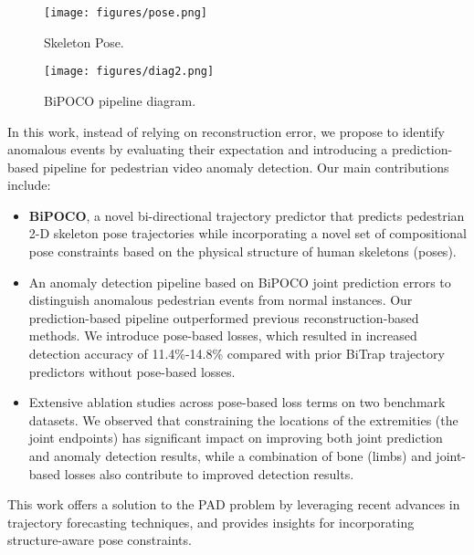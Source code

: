 \documentclass[nohyperref]{article}
\theoremstyle{plain}
\theoremstyle{definition}
\theoremstyle{remark}
\begin{document}
\begin{figure*}[htp!]
\begin{minipage}{0.2\textwidth}
   \centering
  \texttt{[image: figures/pose.png]}
  \caption{Skeleton Pose.}
 \label{fig:sub1}
  \end{minipage}\qquad
  \begin{minipage}{0.78\textwidth}
    \centering
  \texttt{[image: figures/diag2.png]}
  \vspace{-10mm}
  \caption{BiPOCO pipeline diagram.}
  \label{fig:sub2}
  \end{minipage}
\label{fig:diagram}
\end{figure*}  




\vspace{-1mm}
In this work, instead of relying on reconstruction error, we propose to identify anomalous events by evaluating their expectation and introducing a  prediction-based pipeline for pedestrian video anomaly detection. Our main contributions include:
\begin{itemize}
\vspace{-4mm}
\item \textbf{BiPOCO}, a novel bi-directional  trajectory predictor that predicts  pedestrian 2-D skeleton pose trajectories while incorporating a novel set of compositional pose constraints based on the physical structure of human skeletons (poses). 
\vspace{-2mm}
\item An anomaly detection pipeline based on BiPOCO joint prediction errors to distinguish anomalous pedestrian events from normal instances. Our prediction-based pipeline outperformed previous reconstruction-based methods. We introduce pose-based losses, which resulted in increased detection accuracy of 11.4\%-14.8\% compared with prior BiTrap trajectory predictors without pose-based losses.
\vspace{-2mm}
\item Extensive ablation studies across pose-based loss terms on two benchmark datasets. We observed that constraining the locations of the extremities (the joint endpoints) has significant impact on improving both joint prediction and anomaly detection results, while a combination of bone (limbs) and joint-based losses also contribute to improved detection results. 
\end{itemize}
\vspace{-4mm}
This work offers a solution to the PAD problem by leveraging recent advances in trajectory forecasting techniques, and provides insights for incorporating structure-aware pose constraints.
\end{document}
